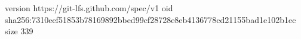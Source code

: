version https://git-lfs.github.com/spec/v1
oid sha256:7310eef51853b78169892bbed99cf28728e8eb4136778cd21155bad1e102b1ec
size 339
